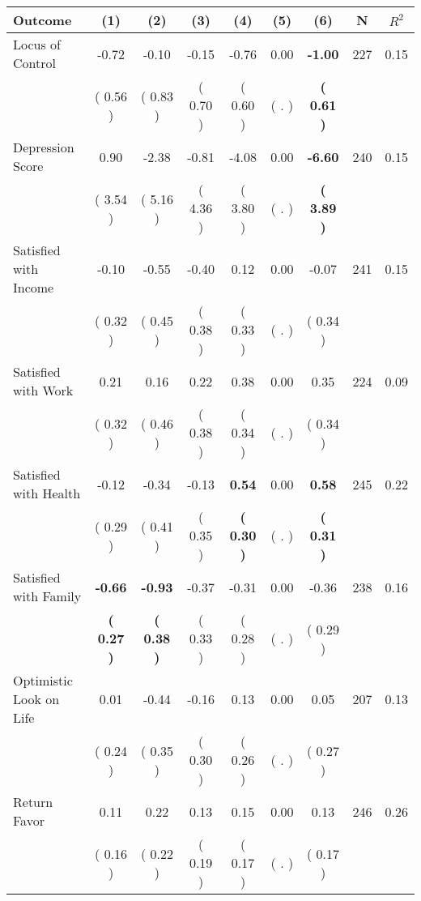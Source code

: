 \begin{tabular}{lcccccccc}
\toprule
 \textbf{Outcome} & \textbf{(1)} & \textbf{(2)} & \textbf{(3)} & \textbf{(4)} & \textbf{(5)} & \textbf{(6)} & \textbf{N} & \textbf{$ R^2$} \\
\midrule
Locus of Control &     -0.72 &     -0.10 &     -0.15 &     -0.76 &      0.00 & \textbf{    -1.00} & 227 &       0.15 \\ 
 & (     0.56 ) & (     0.83 ) & (     0.70 ) & (     0.60 ) & (        . ) & \textbf{(     0.61 )} & \\
Depression Score &      0.90 &     -2.38 &     -0.81 &     -4.08 &      0.00 & \textbf{    -6.60} & 240 &       0.15 \\ 
 & (     3.54 ) & (     5.16 ) & (     4.36 ) & (     3.80 ) & (        . ) & \textbf{(     3.89 )} & \\
Satisfied with Income &     -0.10 &     -0.55 &     -0.40 &      0.12 &      0.00 &     -0.07 & 241 &       0.15 \\ 
 & (     0.32 ) & (     0.45 ) & (     0.38 ) & (     0.33 ) & (        . ) & (     0.34 ) & \\
Satisfied with Work &      0.21 &      0.16 &      0.22 &      0.38 &      0.00 &      0.35 & 224 &       0.09 \\ 
 & (     0.32 ) & (     0.46 ) & (     0.38 ) & (     0.34 ) & (        . ) & (     0.34 ) & \\
Satisfied with Health &     -0.12 &     -0.34 &     -0.13 & \textbf{     0.54} &      0.00 & \textbf{     0.58} & 245 &       0.22 \\ 
 & (     0.29 ) & (     0.41 ) & (     0.35 ) & \textbf{(     0.30 )} & (        . ) & \textbf{(     0.31 )} & \\
Satisfied with Family & \textbf{    -0.66} & \textbf{    -0.93} &     -0.37 &     -0.31 &      0.00 &     -0.36 & 238 &       0.16 \\ 
 & \textbf{(     0.27 )} & \textbf{(     0.38 )} & (     0.33 ) & (     0.28 ) & (        . ) & (     0.29 ) & \\
Optimistic Look on Life &      0.01 &     -0.44 &     -0.16 &      0.13 &      0.00 &      0.05 & 207 &       0.13 \\ 
 & (     0.24 ) & (     0.35 ) & (     0.30 ) & (     0.26 ) & (        . ) & (     0.27 ) & \\
Return Favor &      0.11 &      0.22 &      0.13 &      0.15 &      0.00 &      0.13 & 246 &       0.26 \\ 
 & (     0.16 ) & (     0.22 ) & (     0.19 ) & (     0.17 ) & (        . ) & (     0.17 ) & \\

\end{tabular}
